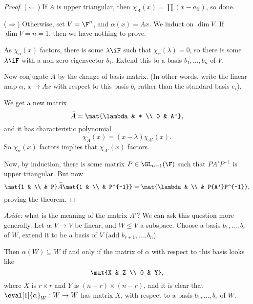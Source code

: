 \begin{proof}
	($\Leftarrow$) If $A$ is upper triangular, then $\chi_A(x) = \prod (x-a_{ii})$, so done.
	
	($\Rightarrow$) Otherwise, set $V = \F^n$, and $\alpha (x) = Ax$. We induct on $\dim V$. If $\dim V=n=1$, then we have nothing to prove. %
	
	As $\chi_\alpha(x)$ factors, there is some $\lambda\iF$ such that $\chi_\alpha(\lambda)=0$, so there is some $\lambda\iF$ with a non-zero eigenvector $b_1$. Extend this to a basis $b_1, \dots, b_n$ of $V$.  %
	
	Now conjugate $A$ by the change of basis matrix.  (In other words, write the linear map $\alpha$, $x \mapsto Ax$ with respect to this basis $b_i$ rather than the standard basis $e_i$). %


	We get a new matrix
	\begin{equation*}
		\widetilde{A} =  \mat{\lambda & * \\ 0 & A'},
	\end{equation*}
	and it has characteristic polynomial 
	\begin{equation*}
		  \chi_{\widetilde{A}}(x)
		= \left( x-\lambda \right) \chi_{A'}(x).
	\end{equation*}
	So $\chi_\alpha(x)$ factors implies that $\chi_{A'}(x)$ factors.
	
	Now, by induction, there is some matrix $P\in\GL_{n-1}(\F)$ such that $PA'P^{-1}$ is upper triangular. But now %
	\begin{equation*}
		  \mat{1 & \\  & P} \widetilde{A} \mat{1 & \\  & P^{-1}}
		= \mat{\lambda & \\  & P{A'}P^{-1}},
	\end{equation*}
	proving the theorem.
\end{proof}

\emph{Aside:} what is the meaning of the matrix $A'$? We can ask this question more generally. Let $\alpha:V\to V$ be linear, and $W\leq V$ a subspace. Choose a basis $b_1,\ldots,b_r$ of $W$, extend it to be a basis of $V$ (add $b_{r+1},\ldots,b_n$).

Then $\alpha(W)\subseteq W$ if and only if the matrix of $\alpha$ with respect to this basis looks like
\begin{equation*}
	\mat{X & Z \\ 0 & Y},
\end{equation*}
where $X$ is $r\times r$ and $Y$ is $\left( n-r \right)\times\left( n-r \right)$, and it is clear that $\eval[1]{\alpha}_W:W\to W$ has matrix $X$, with respect to a basis $b_1,\ldots,b_r$ of $W$.

